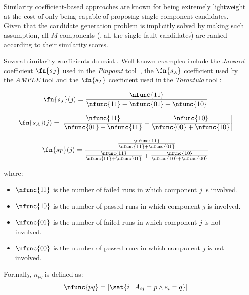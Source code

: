 Similarity coefficient-based approaches are known for being extremely
lightweight at the cost of only being capable of proposing single
component candidates.
%
Given that the candidate generation problem is implicitly solved by
making such assumption, all $M$ components (\ie, all the single fault
candidates) are ranked according to their similarity scores.


Several similarity coefficients do exist \citep{Abreu09a}.
%
Well known examples include the \emph{Jaccard} coefficient
$\fn{s_J}$ used in the \emph{Pinpoint} tool~\citep{Chen02}, the
$\fn{s_A}$ coefficient used by the \emph{AMPLE} tool
\citep{Dallmeier05} and the $\fn{s_T}$ coefficient used in the
\emph{Tarantula} tool \citep{Jones05}:

\begin{equation}
  \label{eq:related-work:jaccard}
  \fn{s_J}(j) = \frac{\nfunc{11}}{\nfunc{11}+\nfunc{01}+\nfunc{10}}
\end{equation}

\begin{equation}
  \fn{s_A} (j) = \bigg| \frac{\nfunc{11}}{\nfunc{01}+\nfunc{11}} - \frac{\nfunc{10}}{\nfunc{00}+\nfunc{10}} \bigg|
\end{equation}

\begin{equation}
  \label{eq:related-work:tarantula}
  \fn{s_T}(j) = \frac{\frac{\nfunc{11}}{\nfunc{11}+\nfunc{01}}}{ \frac{\nfunc{11}}{\nfunc{11}+\nfunc{01}} + \frac{\nfunc{10}}{\nfunc{10}+\nfunc{00}}}
\end{equation}

\noindent where:
%
\begin{itemize}[nolistsep]
\item $\nfunc{11}$ is the number of failed runs in which component $j$ is involved.
\item $\nfunc{10}$ is the number of passed runs in which component $j$ is involved.
\item $\nfunc{01}$ is the number of failed runs in which component $j$ is not involved.
\item $\nfunc{00}$ is the number of passed runs in which component $j$ is not involved.
\end{itemize}

Formally, $n_{pq}$ is defined as:
\begin{equation}
  \label{eq:related-work:occurrence}
  \nfunc{pq} = |\set{i\mid A_{ij}=p \wedge e_i=q}|
\end{equation}


